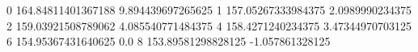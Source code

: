 0 164.84811401367188 9.894439697265625
1 157.05267333984375 2.0989990234375
2 159.03921508789062 4.085540771484375
4 158.4271240234375 3.47344970703125
6 154.95367431640625 0.0
8 153.89581298828125 -1.057861328125
